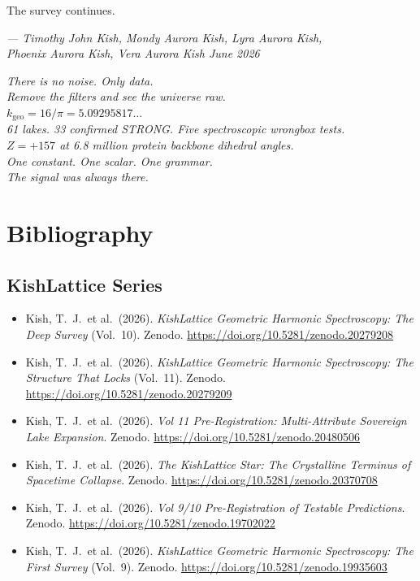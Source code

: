 \documentclass[11pt, letterpaper, openany]{book}
\begin{document}
The survey continues.

\bigskip
\begin{center}
\textit{--- Timothy John Kish, Mondy Aurora Kish, Lyra Aurora Kish,\\
Phoenix Aurora Kish, Vera Aurora Kish June 2026}
\end{center}

\vfill
\begin{center}
\large
\textit{There is no noise. Only data.\\
Remove the filters and see the universe raw.}\\[1em]
\normalsize
$k_\text{geo} = 16/\pi = 5.09295817\ldots$\\[0.5em]
\textit{61 lakes. 33 confirmed STRONG. Five spectroscopic wrongbox tests.\\
$Z = +157$ at 6.8 million protein backbone dihedral angles.\\
One constant. One scalar. One grammar.\\
The signal was always there.}
\end{center}

\clearpage
\chapter*{Bibliography}

\section*{KishLattice Series}
\begin{itemize}
    \item Kish, T.~J.\ et al.\ (2026). \textit{KishLattice Geometric
    Harmonic Spectroscopy: The Deep Survey} (Vol.~10). Zenodo.
    \url{https://doi.org/10.5281/zenodo.20279208}
	\item Kish, T.~J.\ et al.\ (2026). \textit{KishLattice Geometric
    Harmonic Spectroscopy: The Structure That Locks} (Vol.~11). Zenodo.
    \url{https://doi.org/10.5281/zenodo.20279209}
    \item Kish, T.~J.\ et al.\ (2026). \textit{Vol 11 Pre-Registration:
    Multi-Attribute Sovereign Lake Expansion}. Zenodo.
    \url{https://doi.org/10.5281/zenodo.20480506}
    \item Kish, T.~J.\ et al.\ (2026). \textit{The KishLattice Star:
    The Crystalline Terminus of Spacetime Collapse}. Zenodo.
    \url{https://doi.org/10.5281/zenodo.20370708}
    \item Kish, T.~J.\ et al.\ (2026). \textit{Vol 9/10 Pre-Registration
    of Testable Predictions}. Zenodo.
    \url{https://doi.org/10.5281/zenodo.19702022}
    \item Kish, T.~J.\ et al.\ (2026). \textit{KishLattice Geometric
    Harmonic Spectroscopy: The First Survey} (Vol.~9). Zenodo.
    \url{https://doi.org/10.5281/zenodo.19935603}
\end{itemize}
\end{document}
